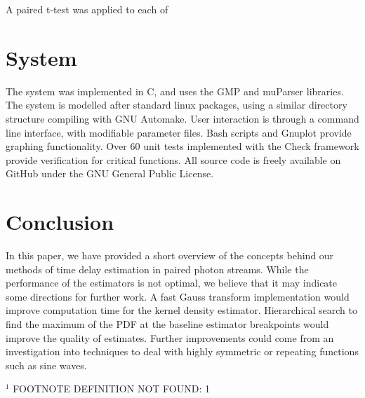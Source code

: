 \documentclass[11pt]{article}
\begin{document}
  A paired t-test was applied to each of 
\section{System}
\label{sec-6}

  The system was implemented in C, and uses the GMP \cite{gmp} and muParser
  \cite{mup} libraries. The system is modelled after standard linux packages,
  using a similar directory structure compiling with GNU Automake. User
  interaction is through a command line interface, with modifiable parameter
  files. Bash scripts and Gnuplot provide graphing functionality. Over
  60 unit tests implemented with the Check \cite{check} framework provide
  verification for critical functions. All source code is freely available on
  GitHub \cite{repo} under the GNU General Public License.
\section{Conclusion}
\label{sec-7}

  In this paper, we have provided a short overview of the concepts behind our
  methods of time delay estimation in paired photon streams. While the
  performance of the estimators is not optimal, we believe that it may indicate
  some directions for further work. A fast Gauss transform implementation would
  improve computation time for the kernel density estimator. Hierarchical search
  to find the maximum of the PDF at the baseline estimator breakpoints would
  improve the quality of estimates. Further improvements could come from an
  investigation into techniques to deal with highly symmetric or repeating
  functions such as sine waves.

\printbibliography

$^{1}$ FOOTNOTE DEFINITION NOT FOUND: 1
\end{document}
